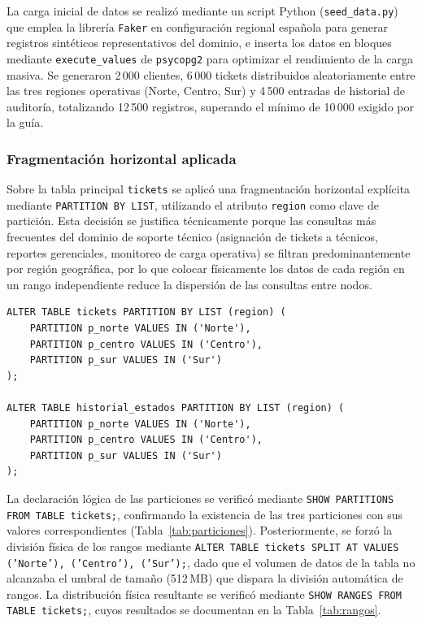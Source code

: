 \documentclass[12pt, a4paper]{article}
\begin{document}
La carga inicial de datos se realizó mediante un script Python (\texttt{seed\_data.py}) que emplea la librería \texttt{Faker} en configuración regional española para generar registros sintéticos representativos del dominio, e inserta los datos en bloques mediante \texttt{execute\_values} de \texttt{psycopg2} para optimizar el rendimiento de la carga masiva. Se generaron 2\,000 clientes, 6\,000 tickets distribuidos aleatoriamente entre las tres regiones operativas (Norte, Centro, Sur) y 4\,500 entradas de historial de auditoría, totalizando 12\,500 registros, superando el mínimo de 10\,000 exigido por la guía.

\subsubsection{Fragmentación horizontal aplicada}
\label{fragmentacion-aplicada}

Sobre la tabla principal \texttt{tickets} se aplicó una fragmentación horizontal explícita mediante \texttt{PARTITION BY LIST}, utilizando el atributo \texttt{region} como clave de partición. Esta decisión se justifica técnicamente porque las consultas más frecuentes del dominio de soporte técnico (asignación de tickets a técnicos, reportes gerenciales, monitoreo de carga operativa) se filtran predominantemente por región geográfica, por lo que colocar físicamente los datos de cada región en un rango independiente reduce la dispersión de las consultas entre nodos.

\begin{lstlisting}[style=sqlstyle, caption={Fragmentación horizontal por región en la tabla \texttt{tickets}}, label={lst:partitions}]
ALTER TABLE tickets PARTITION BY LIST (region) (
    PARTITION p_norte VALUES IN ('Norte'),
    PARTITION p_centro VALUES IN ('Centro'),
    PARTITION p_sur VALUES IN ('Sur')
);

ALTER TABLE historial_estados PARTITION BY LIST (region) (
    PARTITION p_norte VALUES IN ('Norte'),
    PARTITION p_centro VALUES IN ('Centro'),
    PARTITION p_sur VALUES IN ('Sur')
);
\end{lstlisting}

La declaración lógica de las particiones se verificó mediante \texttt{SHOW PARTITIONS FROM TABLE tickets;}, confirmando la existencia de las tres particiones con sus valores correspondientes (Tabla~\ref{tab:particiones}). Posteriormente, se forzó la división física de los rangos mediante \texttt{ALTER TABLE tickets SPLIT AT VALUES ('Norte'), ('Centro'), ('Sur');}, dado que el volumen de datos de la tabla no alcanzaba el umbral de tamaño (512\,MB) que dispara la división automática de rangos. La distribución física resultante se verificó mediante \texttt{SHOW RANGES FROM TABLE tickets;}, cuyos resultados se documentan en la Tabla~\ref{tab:rangos}.
\end{document}
